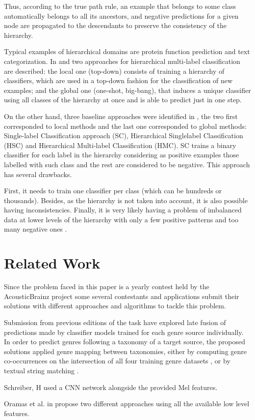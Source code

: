 Thus, according to the true path rule, an example that belongs to some class automatically belongs to all its ancestors,
and negative predictions for a given node are propagated to the descendants to
preserve the consistency of the hierarchy. 

Typical examples of hierarchical domains
are protein function prediction and text categorization.
In \cite{Cerri2012} and \cite{Silla2011} two approaches for hierarchical multi-label classification are
described: the local one (top-down) consists of training a hierarchy of classifiers, which are used in a top-down fashion for the classification of new examples; and the global one (one-shot, big-bang), that induces
a unique classifier using all classes of the hierarchy at once and is able to predict just in one step. 

On the other hand, three baseline approaches were identified in \cite{Vens2008}, the two first corresponded to local methods and the last one corresponded
to global methods: Single-label Classification approach (SC), Hierarchical Singlelabel Classification (HSC) and Hierarchical Multi-label Classification (HMC).
SC trains a binary classifier for each label in the hierarchy considering as
positive examples those labelled with such class and the rest are considered to be
negative. This approach has several drawbacks. 

First, it needs to train one classifier per class (which can be hundreds or thousands). 
Besides, as the hierarchy is not taken into account, it is also possible having inconsistencies. 
Finally, it is very likely having a problem of imbalanced data at lower levels of the hierarchy with only a few positive patterns and too many negative ones \cite{Gibaja2014}.



\section{Related Work}

Since the problem faced in this paper is a yearly contest held by the AcousticBrainz project \cite{genretask} 
some several contestants and applications submit their solutions with different approaches and algorithms to tackle this problem.

Submission from previous editions of the task have explored late fusion of predictions made by classifier models trained for each genre
source individually. In order to predict genres following a taxonomy
of a target source, the proposed solutions applied genre mapping
between taxonomies, either by computing genre co-occurrences on
the intersection of all four training genre datasets \cite{koutinimediaeval}, or by textual
string matching \cite{Murauer2017}.

Schreiber, H \cite{schreiber2018mediaeval} used a CNN network alongside the provided Mel features.

Oramas et al. in \cite{oramas2018mediaeval} propose two different approaches using all the available low level features.

